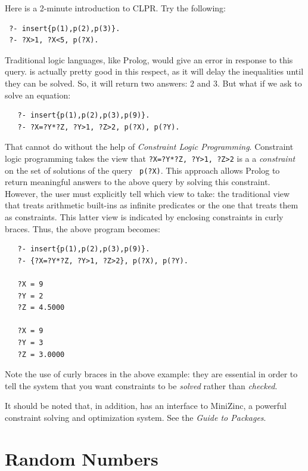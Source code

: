 \documentclass[11pt]{article}
\newcommand{\ERGO}{\mbox{\smaller{\ensuremath{\cal{E}}\smaller{{\sc{RGO}}}}}\xspace}
\newcommand{\FLSYSTEM}{\ERGO}
\begin{document}
Here is a 2-minute introduction to CLPR. Try the following:
\begin{verbatim}
 ?- insert{p(1),p(2),p(3)}.
 ?- ?X>1, ?X<5, p(?X).
\end{verbatim}
Traditional logic languages, like Prolog, would give an error
in response to this query. \FLSYSTEM is actually pretty good in this respect,
as it will delay the inequalities until they can be solved. So, it will
return two answers: 2 and 3. But what if we ask \FLSYSTEM to solve an equation:
\begin{verbatim}
   ?- insert{p(1),p(2),p(3),p(9)}.
   ?- ?X=?Y*?Z, ?Y>1, ?Z>2, p(?X), p(?Y).
\end{verbatim}
That \FLSYSTEM cannot do without the help of 
\emph{Constraint Logic Programming}.
Constraint logic programming takes the view that
\texttt{?X=?Y*?Z, ?Y>1, ?Z>2} is a  
a \emph{constraint} on the set of solutions of the query {\tt
  p(?X)}. This approach allows Prolog to return meaningful answers to the
above query by solving this constraint.
However, the user must explicitly tell \FLSYSTEM which view
  to take: the traditional view that treats arithmetic built-ins as
  infinite predicates or the one that treats them as constraints.
  This latter view is indicated by enclosing constraints in curly
  braces. Thus, the above program becomes:
\begin{verbatim}
   ?- insert{p(1),p(2),p(3),p(9)}.
   ?- {?X=?Y*?Z, ?Y>1, ?Z>2}, p(?X), p(?Y).
  
   ?X = 9
   ?Y = 2
   ?Z = 4.5000

   ?X = 9
   ?Y = 3
   ?Z = 3.0000
\end{verbatim}
  Note the use of curly braces in the above example: they are essential in
  order to tell the system that you want constraints to be \emph{solved}
  rather than \emph{checked}.  

  It should be noted that, in addition,
  \ERGO has an interface to MiniZinc, a powerful
  constraint solving and optimization system.
  See 
the \emph{Guide to \FLSYSTEM Packages}.

\section{Random Numbers} \label{sec-random-num}
\end{document}
